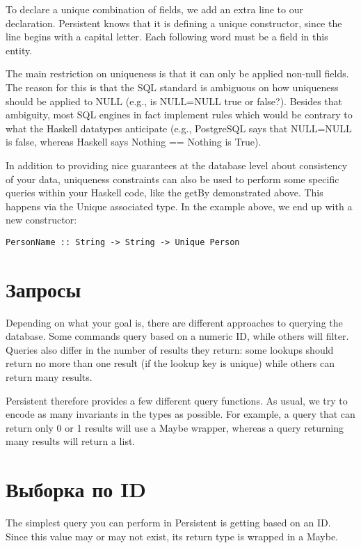 To declare a unique combination of fields, we add an extra line to our declaration. Persistent knows that it is defining a unique constructor, since the line begins with a capital letter. Each following word must be a field in this entity.

The main restriction on uniqueness is that it can only be applied non-null fields. The reason for this is that the SQL standard is ambiguous on how uniqueness should be applied to NULL (e.g., is NULL=NULL true or false?). Besides that ambiguity, most SQL engines in fact implement rules which would be contrary to what the Haskell datatypes anticipate (e.g., PostgreSQL says that NULL=NULL is false, whereas Haskell says Nothing == Nothing is True).

In addition to providing nice guarantees at the database level about consistency of your data, uniqueness constraints can also be used to perform some specific queries within your Haskell code, like the getBy demonstrated above. This happens via the Unique associated type. In the example above, we end up with a new constructor:

\begin{lstlisting}
PersonName :: String -> String -> Unique Person
\end{lstlisting}

\section{Запросы} %

Depending on what your goal is, there are different approaches to querying the database. Some commands query based on a numeric ID, while others will filter. Queries also differ in the number of results they return: some lookups should return no more than one result (if the lookup key is unique) while others can return many results.

Persistent therefore provides a few different query functions. As usual, we try to encode as many invariants in the types as possible. For example, a query that can return only 0 or 1 results will use a Maybe wrapper, whereas a query returning many results will return a list.

\section{Выборка по ID} %

The simplest query you can perform in Persistent is getting based on an ID. Since this value may or may not exist, its return type is wrapped in a Maybe.


